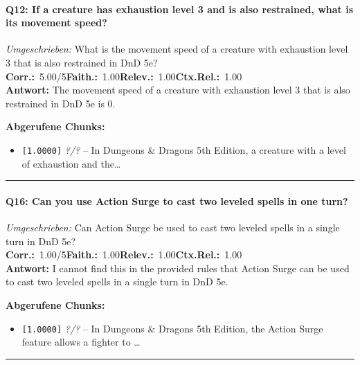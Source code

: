 \paragraph{Q12: If a creature has exhaustion level 3 and is also restrained, what is its movement speed?}
\textit{Umgeschrieben:} What is the movement speed of a creature with exhaustion level 3 that is also restrained in DnD 5e?\\[2pt]
\noindent \textbf{Corr.:}~5.00/5\quad \textbf{Faith.:}~1.00\quad \textbf{Relev.:}~1.00\quad \textbf{Ctx.Rel.:}~1.00\\

\noindent\textbf{Antwort:} The movement speed of a creature with exhaustion level 3 that is also restrained in DnD 5e is 0.

\noindent\textbf{Abgerufene Chunks:}
\begin{itemize}[noitemsep, topsep=2pt]
  \item[\textbf{\#1}] \texttt{[1.0000]} \textit{?/?} -- In Dungeons \& Dragons 5th Edition, a creature with a level of exhaustion and the\ldots
\end{itemize}
\vspace{4pt}
\hrule
\vspace{6pt}

\paragraph{Q16: Can you use Action Surge to cast two leveled spells in one turn?}
\textit{Umgeschrieben:} Can Action Surge be used to cast two leveled spells in a single turn in DnD 5e?\\[2pt]
\noindent \textbf{Corr.:}~1.00/5\quad \textbf{Faith.:}~1.00\quad \textbf{Relev.:}~1.00\quad \textbf{Ctx.Rel.:}~1.00\\

\noindent\textbf{Antwort:} I cannot find this in the provided rules that Action Surge can be used to cast two leveled spells in a single turn in DnD 5e.

\noindent\textbf{Abgerufene Chunks:}
\begin{itemize}[noitemsep, topsep=2pt]
  \item[\textbf{\#1}] \texttt{[1.0000]} \textit{?/?} -- In Dungeons \& Dragons 5th Edition, the Action Surge feature allows a fighter to \ldots
\end{itemize}
\vspace{4pt}
\hrule
\vspace{6pt}
